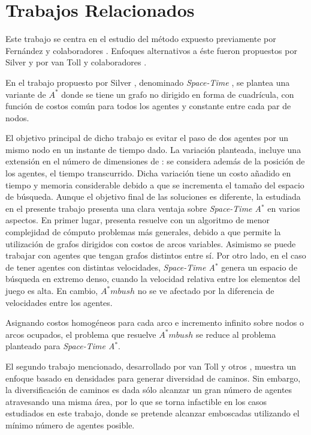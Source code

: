 \section{Trabajos Relacionados}
\label{sec:state_of_the_art}

Este trabajo se centra en el estudio del m\'etodo expuesto
previamente por Fern\'andez y colaboradores \cite{FGC12e}\cite{FGC12}.
Enfoques alternativos a \'este fueron propuestos por Silver \cite{Sil06}
y por van Toll y colaboradores \cite{TCG12}.

En el trabajo propuesto por Silver \cite{Sil06}, denominado
\textit{Space-Time \astar}, se plantea una variante de $A^*$ 
donde se tiene un grafo no dirigido en forma de cuadrícula,
con función de costos común para todos los agentes y 
constante entre cada par de nodos.

El objetivo principal de dicho trabajo es evitar el paso de
dos agentes por un mismo nodo en un instante de tiempo dado.
La variación planteada, incluye una extensión en el número
de dimensiones de \astar: se considera además de la posición
de los agentes, el tiempo transcurrido. Dicha variación tiene
un costo añadido en tiempo y memoria considerable debido a que
se incrementa el tamaño del espacio de búsqueda. Aunque el objetivo
final de las soluciones es diferente, la estudiada en el presente
trabajo presenta una clara ventaja sobre \textit{Space-Time A$^*$}
en varios aspectos. En primer lugar, presenta resuelve con un algoritmo
de menor complejidad de c\'omputo problemas m\'as generales, debido a
que permite la utilizaci\'on de grafos dirigidos con costos de arcos
variables. Asimismo se puede trabajar con agentes que
tengan grafos distintos entre sí.
Por otro lado, en el caso de tener agentes con distintas velocidades,
\textit{Space-Time A$^*$} genera un espacio de búsqueda en extremo
denso, cuando la velocidad relativa entre los e\-le\-men\-tos del juego es
alta. En cambio, $A^*mbush$ no se ve afectado por la diferencia de 
velocidades entre los agentes.

Asignando costos homogéneos para cada arco e incremento infinito
sobre nodos o arcos ocupados, el problema que resuelve $A^*mbush$
se reduce al problema planteado para \textit{Space-Time
A$^*$}.

El segundo trabajo mencionado, desarrollado por van Toll y otros
\cite{TCG12}, muestra un enfoque basado en densidades para generar
diversidad de caminos. Sin embargo, la diversificaci\'on de caminos
es dada s\'olo alcanzar un gran n\'umero de agentes atravesando una
misma \'area, por lo que se torna infactible en los casos estudiados
en este trabajo, donde se pretende alcanzar emboscadas utilizando
el m\'inimo n\'umero de agentes posible.
